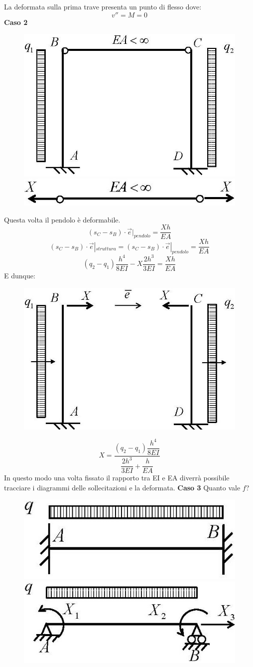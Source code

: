 \documentclass{article}
\begin{document}
\begin{adjustwidth}{2in}{}
		La deformata sulla prima trave presenta un punto di
		flesso dove:
		\[ v'' = M = 0\]
\newpage		
\textbf{Caso 2}

\begin{figure}[H]
	\centering
	\includegraphics[width=0.4\linewidth]{"immagini/1.PARTE8_Pagina_55 (2)"}
	\includegraphics[width=0.4\linewidth]{"immagini/1.PARTE8_Pagina_55 (3)"}		
\end{figure}

		Questa volta il pendolo è deformabile. 
		\[ (s_C - s_B) \cdot \vec{e}|_{pendolo} = \dfrac{Xh}{EA}\]
		\[ (s_C - s_B) \cdot \vec{e}|_{struttura} = (s_C - s_B) \cdot \vec{e}|_{pendolo} = \dfrac{Xh}{EA} \]
		\[(q_2 - q_1)\dfrac{h^4}{8EI} - X\dfrac{2h^3}{3EI} = \dfrac{Xh}{EA}\]
		E dunque:

\begin{figure}[H]
	\centering
	\includegraphics[width=0.4\linewidth]{"immagini/1.PARTE8_Pagina_52"}	
\end{figure}
 
		\[ X= \dfrac{(q_2 - q_1)\dfrac{h^4}{8EI}}{\dfrac{2h^3}{3EI}+\dfrac{h}{EA}}\]
		In questo modo una volta fissato il rapporto tra EI e EA diverrà
		possibile tracciare i diagrammi delle
		sollecitazioni e la deformata. \newline 
\newpage
\textbf{Caso 3}	\newline 
Quanto vale $f$?	
		
\begin{figure}[H]
	\centering
	\includegraphics[width=0.4\linewidth]{"immagini/1.PARTE8_Pagina_56 (2)"}	
	\includegraphics[width=0.4\linewidth]{"immagini/1.PARTE8_Pagina_56"}	
\end{figure}


\end{adjustwidth}
\end{document}

